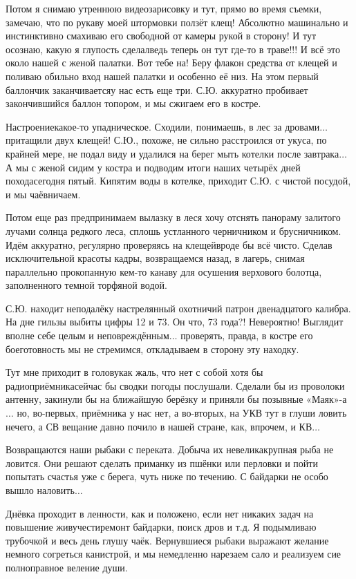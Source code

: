 Потом я снимаю утреннюю видеозарисовку и тут, прямо во время съемки, замечаю, что по рукаву моей штормовки ползёт клещ! Абсолютно машинально и инстинктивно смахиваю его свободной от камеры рукой в сторону! И тут осознаю, какую я глупость сделал\mdash ведь теперь он тут где-то в траве!!! И всё это около нашей с женой палатки. Вот тебе на! Беру флакон средства от клещей и поливаю обильно вход нашей палатки и особенно её низ. На этом первый баллончик заканчивается\mdash у нас есть еще три. С.Ю. аккуратно пробивает закончившийся баллон топором, и мы сжигаем его в костре. 

Настроение\mdash какое-то упадническое. Сходили, понимаешь, в лес за дровами$\ldots$ притащили двух клещей! С.Ю., похоже, не сильно расстроился от укуса, по крайней мере, не подал виду и удалился на берег мыть котелки после завтрака$\ldots$ А мы с женой сидим у костра и подводим итоги наших четырёх дней похода\mdash сегодня пятый. Кипятим воды в котелке, приходит С.Ю. с чистой посудой, и мы чаёвничаем.

Потом еще раз предпринимаем вылазку в лес\mdash я хочу отснять панораму залитого лучами солнца редкого леса, сплошь устланного черничником и брусничником. Идём аккуратно, регулярно проверяясь на клещей\mdash вроде бы всё чисто. Сделав исключительной красоты кадры, возвращаемся назад, в лагерь, снимая параллельно прокопанную кем-то канаву для осушения верхового болотца, заполненного темной торфяной водой.

С.Ю. находит неподалёку настрелянный охотничий патрон двенадцатого калибра. На дне гильзы выбиты цифры 12 и 73. Он что, 73 года?! Невероятно! Выглядит вполне себе целым и неповреждённым$\ldots$ проверять, правда, в костре его боеготовность мы не стремимся, откладываем в сторону эту находку. 

Тут мне приходит в голову\mdash как жаль, что нет с собой хотя бы радиоприёмника\mdash сейчас бы сводки погоды послушали. Сделали бы из проволоки антенну, закинули бы на ближайшую берёзку и приняли бы позывные «Маяк»-а$\ldots$ но, во-первых, приёмника у нас нет, а во-вторых, на УКВ тут в глуши ловить нечего, а СВ вещание давно почило в нашей стране, как, впрочем, и КВ$\ldots$

Возвращаются наши рыбаки с переката. Добыча их невелика\mdash крупная рыба не ловится. Они решают сделать приманку из пшёнки или перловки и пойти попытать счастья уже с берега, чуть ниже по течению. С байдарки не особо вышло наловить$\ldots$

Днёвка проходит в ленности, как и положено, если нет никаких задач на повышение живучести\mdash ремонт байдарки, поиск дров и т.д. Я подымливаю трубочкой и весь день глушу чаёк. Вернувшиеся рыбаки выражают желание немного согреться канистрой, и мы немедленно нарезаем сало и реализуем сие полноправное веление души.

